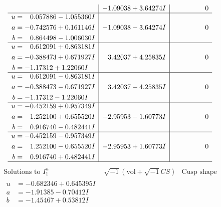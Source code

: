 \documentclass[1p]{elsarticle_modified}
\theoremstyle{definition}
\newcommand{\I}{\sqrt{-1}}
\begin{document}
$$\begin{array}{c|c|c}
 & -1.09038 + 3.64274 I & \phantom{-0.000000 } 0 \\ \hline\begin{aligned}
u &= \phantom{-}0.057886 - 1.055360 I \\
a &= -0.742576 + 0.161146 I \\
b &= \phantom{-}0.864498 - 1.006030 I\end{aligned}
 & -1.09038 - 3.64274 I & \phantom{-0.000000 } 0 \\ \hline\begin{aligned}
u &= \phantom{-}0.612091 + 0.863181 I \\
a &= -0.388473 + 0.671927 I \\
b &= -1.17312 + 1.22060 I\end{aligned}
 & \phantom{-}3.42037 + 4.25835 I & \phantom{-0.000000 } 0 \\ \hline\begin{aligned}
u &= \phantom{-}0.612091 - 0.863181 I \\
a &= -0.388473 - 0.671927 I \\
b &= -1.17312 - 1.22060 I\end{aligned}
 & \phantom{-}3.42037 - 4.25835 I & \phantom{-0.000000 } 0 \\ \hline\begin{aligned}
u &= -0.452159 + 0.957349 I \\
a &= \phantom{-}1.252100 + 0.655520 I \\
b &= \phantom{-}0.916740 - 0.482441 I\end{aligned}
 & -2.95953 - 1.60773 I & \phantom{-0.000000 } 0 \\ \hline\begin{aligned}
u &= -0.452159 - 0.957349 I \\
a &= \phantom{-}1.252100 - 0.655520 I \\
b &= \phantom{-}0.916740 + 0.482441 I\end{aligned}
 & -2.95953 + 1.60773 I & \phantom{-0.000000 } 0\\
 \hline 
 \end{array}$$\newpage$$\begin{array}{c|c|c}  
\text{Solutions to }I^u_{1}& \I (\text{vol} + \sqrt{-1}CS) & \text{Cusp shape}\\
 \hline 
\begin{aligned}
u &= -0.682346 + 0.645395 I \\
a &= -1.91385 - 0.70412 I \\
b &= -1.45467 + 0.53812 I\end{aligned}

\end{array}$$
\end{document}
